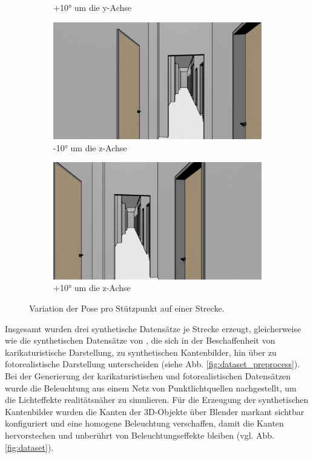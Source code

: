 \begin{figure}
\begin{subfigure}[t]{0.18\linewidth}
		\caption{+10° um die y-Achse}
		\label{subfig:iz0_y+10}
	\end{subfigure}
	\hfill
	\begin{subfigure}[t]{0.18\linewidth}
		\centering
		\includegraphics[width=\linewidth]{images/syn_dataset/00024.png}
		\caption{-10° um die z-Achse}
		\label{subfig:iz-10_y0}
	\end{subfigure}
	\hfill
	\begin{subfigure}[t]{0.18\linewidth}
		\centering
		\includegraphics[width=\linewidth]{images/syn_dataset/00022.png}
		\caption{+10° um die z-Achse}
		\label{subfig:iz+10_y0}
	\end{subfigure}
	\caption{Variation der Pose pro Stützpunkt auf einer Strecke.}
	\label{fig:dataset_variation}
\end{figure}

Insgesamt wurden drei synthetische Datensätze je Strecke erzeugt, gleicherweise wie die synthetischen Datensätze von \citet{acharyaBIMPoseNetIndoorCamera2019}, die sich in der Beschaffenheit von karikaturistische Darstellung, zu synthetischen Kantenbilder, hin über zu fotorealistische Darstellung unterscheiden (siehe Abb. \ref{fig:dataset_preprocess}). Bei der Generierung der karikaturistischen und fotorealistischen Datensätzen wurde die Beleuchtung aus einem Netz von Punktlichtquellen nachgestellt, um die Lichteffekte realitätsnäher zu simulieren.
Für die Erzeugung der synthetischen Kantenbilder wurden die Kanten der 3D-Objekte über Blender markant sichtbar konfiguriert und eine homogene Beleuchtung verschaffen, damit die Kanten hervorstechen und unberührt von Beleuchtungseffekte bleiben (vgl. Abb. \ref{fig:dataset}). 

